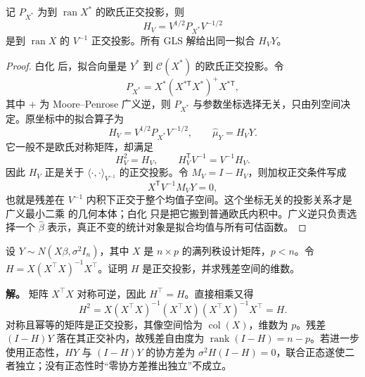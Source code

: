 \begin{proposition}[加权正交投影]

记 $P_{X^*}$ 为到 $\operatorname{ran}X^*$ 的欧氏正交投影，则
\[
 H_V=V^{1/2}P_{X^*}V^{-1/2}
\]
是到 $\operatorname{ran}X$ 的 $V^{-1}$ 正交投影。所有 GLS 解给出同一拟合 $H_VY$。

\end{proposition}
\begin{proof}
白化 后，拟合向量是 $Y^*$ 到 $\mathcal C(X^*)$ 的欧氏正交投影。令
\[
 P_{X^*}=X^*(X^{*\mathsf T}X^*)^+X^{*\mathsf T},
\]
其中 $+$ 为 Moore--Penrose 广义逆，则 $P_{X^*}$ 与参数坐标选择无关，只由列空间决定。原坐标中的拟合算子为
\[
 H_V
 =V^{1/2}P_{X^*}V^{-1/2},
 \qquad
 \widehat\mu_Y=H_VY.
\]
它一般不是欧氏对称矩阵，却满足
\[
 H_V^2=H_V,
 \qquad
 H_V^{\mathsf T}V^{-1}=V^{-1}H_V.
\]
因此 $H_V$ 正是关于 $\langle\cdot,\cdot\rangle_{V^{-1}}$ 的正交投影。令 $M_V=I-H_V$，则加权正交条件写成
\[
 X^{\mathsf T}V^{-1}M_VY=0,
\]
也就是残差在 $V^{-1}$ 内积下正交于整个均值子空间。这个坐标无关的投影关系才是 广义最小二乘 的几何本体；白化 只是把它搬到普通欧氏内积中。广义逆只负责选择一个 $\widehat\beta$ 表示，真正不变的统计对象是拟合均值与所有可估函数。
\end{proof}

\begin{workedexample}[正态线性模型的残差自由度]
设 \(Y\sim N(X\beta,\sigma^2I_n)\)，其中 \(X\) 是 \(n\times p\) 的满列秩设计矩阵，\(p<n\)。令 \(H=X(X^\top X)^{-1}X^\top\)。证明 \(H\) 是正交投影，并求残差空间的维数。

\textbf{解。} 矩阵 \(X^\top X\) 对称可逆，因此 \(H^\top=H\)。直接相乘又得
\[
H^2=X(X^\top X)^{-1}(X^\top X)(X^\top X)^{-1}X^\top=H.
\]
对称且幂等的矩阵是正交投影，其像空间恰为 \(\operatorname{col}(X)\)，维数为 \(p\)。残差 \((I-H)Y\) 落在其正交补内，故残差自由度为 \(\operatorname{rank}(I-H)=n-p\)。若进一步使用正态性，\(HY\) 与 \((I-H)Y\) 的协方差为 \(\sigma^2H(I-H)=0\)，联合正态遂使二者独立；没有正态性时“零协方差推出独立”不成立。
\end{workedexample}

